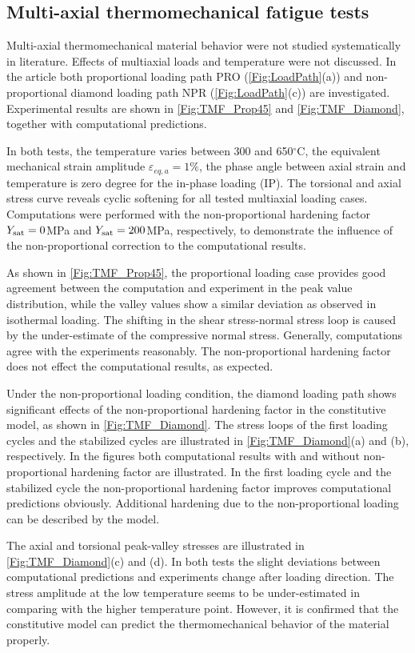 \subsection{Multi-axial thermomechanical fatigue tests}
\noindent
Multi-axial thermomechanical material behavior were not studied systematically in literature. Effects of multiaxial loads and temperature were not discussed. In the article both proportional loading path PRO (\ref{Fig:LoadPath}(a)) and non-proportional diamond loading path NPR (\ref{Fig:LoadPath}(c)) are investigated. Experimental results are shown in \ref{Fig:TMF_Prop45} and \ref{Fig:TMF_Diamond}, together with computational predictions.

In both tests, the temperature varies between 300 and 650$^{\circ}$C, the equivalent mechanical strain amplitude $\varepsilon_{eq,a}=1\%$, the phase angle between axial strain and temperature is zero degree for the in-phase loading (IP).
The torsional and axial stress curve reveals cyclic softening for all tested multiaxial loading cases.
Computations were performed with the non-proportional hardening factor $Y_{\rm sat}=0$MPa and $Y_{\rm sat}=200$MPa, respectively, to demonstrate the influence of the non-proportional correction to the computational results.

As shown in \ref{Fig:TMF_Prop45}, the proportional loading case provides good agreement between the computation and experiment in the peak value distribution, while the valley values show a similar deviation as observed in isothermal loading. The shifting in the shear stress-normal stress loop is caused by the under-estimate of the compressive normal stress. Generally, computations agree with the experiments reasonably. The non-proportional hardening factor does not effect the computational results, as expected.

Under the non-proportional loading condition, the diamond loading path shows significant effects of the non-proportional hardening factor  in the constitutive model, as shown in \ref{Fig:TMF_Diamond}. The stress loops of the first loading cycles and the stabilized cycles are illustrated in \ref{Fig:TMF_Diamond}(a) and (b), respectively. In the figures both computational results with and without non-proportional hardening factor are illustrated. In the first loading cycle and the stabilized cycle the non-proportional hardening factor improves computational predictions obviously. Additional hardening due to the non-proportional loading can be described by the model.

The axial and torsional peak-valley stresses are illustrated in  \ref{Fig:TMF_Diamond}(c) and (d).
In both tests the slight deviations between computational predictions and experiments  change after  loading direction. The stress amplitude at the low temperature seems to be under-estimated in comparing with the higher temperature point. However, it is confirmed that the constitutive model can predict the thermomechanical behavior of the material properly.

